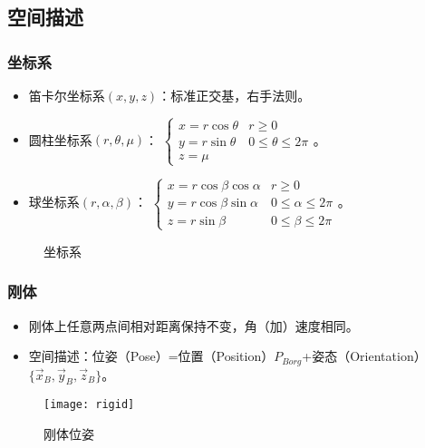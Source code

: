 \documentclass[
12pt, %
a4paper, 
oneside, %
headinclude,footinclude, %
]{scrartcl}
\begin{document}
\subsection{空间描述}
\subsubsection{坐标系}
\begin{itemize}
\item 笛卡尔坐标系$ (x, y, z) $：标准正交基，右手法则。
\item 圆柱坐标系$ (r, \theta, \mu) $：
$ \begin{cases}
x = r\cos\theta &r \geq 0 \\
y = r\sin\theta &0 \leq \theta \leq 2 \pi \\
z = \mu
\end{cases} $。
\item 球坐标系$ (r, \alpha, \beta) $：
$ \begin{cases}
x = r\cos\beta\cos\alpha &r \geq 0 \\
y = r\cos\beta\sin\alpha &0 \leq \alpha \leq 2\pi \\
z = r\sin\beta &0 \leq \beta \leq 2\pi
\end{cases} $。
\end{itemize}

\begin{figure}[H]
\centering
{} \quad
{} \quad
{}
\caption[坐标系]{坐标系}
\end{figure}
\subsubsection{刚体}
\begin{itemize}
\item 刚体上任意两点间相对距离保持不变，角（加）速度相同。
\item 空间描述：位姿（Pose）=位置（Position）$ P_{Borg} $+姿态（Orientation）$ \{\vec x_B, \vec y_B, \vec z_B\} $。
\end{itemize}

\begin{figure}[H]
\centering 
\texttt{[image: rigid]} 
\caption[刚体位姿]{刚体位姿}
\end{figure}
\end{document}

